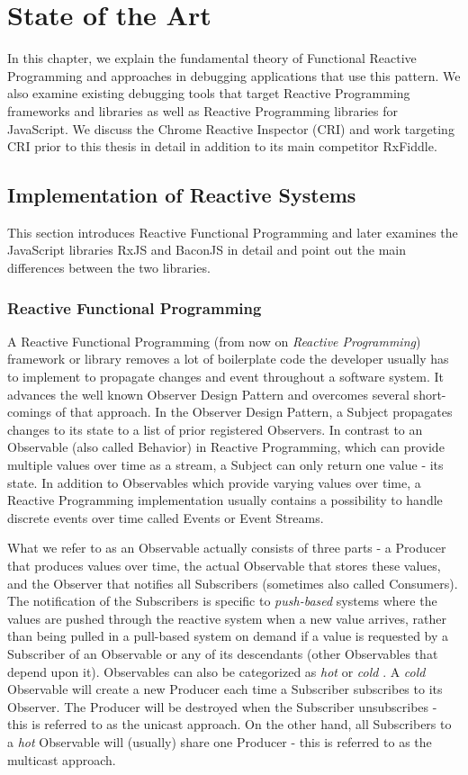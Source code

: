 \chapter{State of the Art} \label{ch:State of the Art}
In this chapter, we explain the fundamental theory of Functional Reactive Programming and approaches in debugging applications that use this pattern. We also examine existing debugging tools that target Reactive Programming frameworks and libraries as well as Reactive Programming libraries for JavaScript. We discuss the Chrome Reactive Inspector (CRI) and work targeting CRI prior to this thesis in detail in addition to its main competitor RxFiddle.

\section{Implementation of Reactive Systems}
This section introduces Reactive Functional Programming and later examines the JavaScript libraries RxJS and BaconJS in detail and point out the main differences between the two libraries.
	\subsection{Reactive Functional Programming}
	A Reactive Functional Programming \cite{FRP} (from now on \emph{Reactive Programming}) framework or library removes a lot of boilerplate code the developer usually has to implement to propagate changes and event throughout a software system. It advances the well known Observer Design Pattern and overcomes several short-comings of that approach. In the Observer Design Pattern, a Subject propagates changes to its state to a list of prior registered Observers. In contrast to an Observable (also called Behavior) in Reactive Programming, which can provide multiple values over time as a stream, a Subject can only return one value - its state.
	In addition to Observables which provide varying values over time, a Reactive Programming implementation usually contains a possibility to handle discrete events over time called Events or Event Streams\cite{BaconJS}.
	
	What we refer to as an Observable actually consists of three parts - a Producer that produces values over time, the actual Observable that stores these values, and the Observer that notifies all Subscribers (sometimes also called Consumers). The notification of the Subscribers is specific to \emph{push-based} systems where the values are pushed through the reactive system when a new value arrives, rather than being pulled in a pull-based system on demand if a value is requested by a Subscriber of an Observable or any of its descendants (other Observables that depend upon it).
	Observables can also be categorized as \emph{hot} or \emph{cold} \cite{HotVsCold}. A \emph{cold} Observable will create a new Producer each time a Subscriber subscribes to its Observer. The Producer will be destroyed when the Subscriber unsubscribes - this is referred to as the unicast approach. On the other hand, all Subscribers to a \emph{hot} Observable will (usually) share one Producer - this is referred to as the multicast approach.
	

